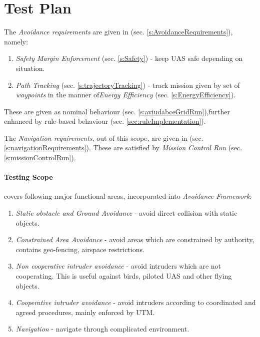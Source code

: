 \section{Test Plan} \label{s:testPlan}

\noindent The \emph{Avoidance requirements} are given in (sec. \ref{s:AvoidanceRequirements}), namely:
\begin{enumerate}
    \item\emph{Safety Margin Enforcement} (sec. \ref{s:Safety}) - keep UAS safe depending on situation.
    \item\emph{Path Tracking} (sec. \ref{s:trajectoryTracking}) - track mission given by set of \emph{waypoints} in the manner of\emph{Energy Efficiency} (sec. \ref{s:EnergyEfficiency}).
\end{enumerate}

These are given as nominal behaviour (sec. \ref{s:aviudabceGridRun}),further enhanced by rule-based behaviour (sec. \ref{sec:ruleImplementation}).

The \emph{Navigation requirements}, out of this scope, are given in (sec. \ref{s:navigationRequirements}). These are satisfied by \emph{Mission Control Run} (sec. \ref{s:missionControlRun}).

\paragraph{Testing Scope} covers following major functional areas, incorporated into \emph{Avoidance Framework}:

\begin{enumerate}
    \item \emph{Static obstacle and Ground Avoidance} - avoid direct collision with static objects.
    
    \item \emph{Constrained Area Avoidance} - avoid areas which are constrained by authority, contains geo-fencing, airspace restrictions. 
    \item \emph{Non cooperative intruder avoidance} - avoid intruders which are not cooperating. This is useful against birds, piloted UAS and other flying objects.
    
    \item \emph{Cooperative intruder avoidance} - avoid intruders according to coordinated and agreed procedures, mainly enforced by UTM.
    
    \item \emph{Navigation} - navigate through complicated environment.
\end{enumerate}

